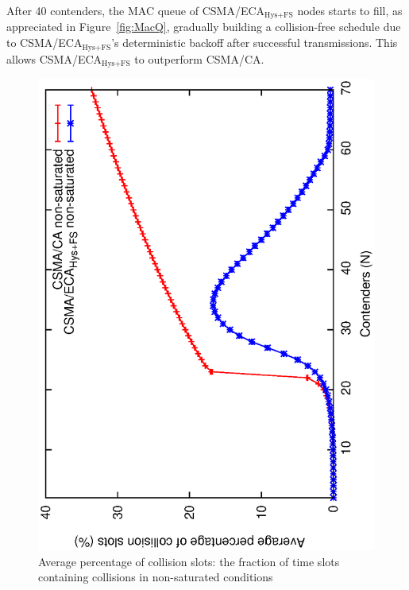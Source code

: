 	After 40 contenders, the MAC queue of CSMA/ECA$_{\text{Hys+FS}}$ nodes starts to fill, as appreciated in Figure~\ref{fig:MacQ}, gradually building a collision-free schedule due to CSMA/ECA$_{\text{Hys+FS}}$'s deterministic backoff after successful transmissions. This allows CSMA/ECA$_{\text{Hys+FS}}$ to outperform CSMA/CA.\\
		
   	\begin{figure}[tb]
		\centering
		\includegraphics[width=0.7\linewidth,angle=-90]{figures/unsaturated/collision-unsaturated/collisions-unsaturated.eps}
		\caption{Average percentage of collision slots: the fraction of time slots containing collisions in non-saturated conditions}
		\label{fig:collisions-unsat}
	\end{figure}	
	
